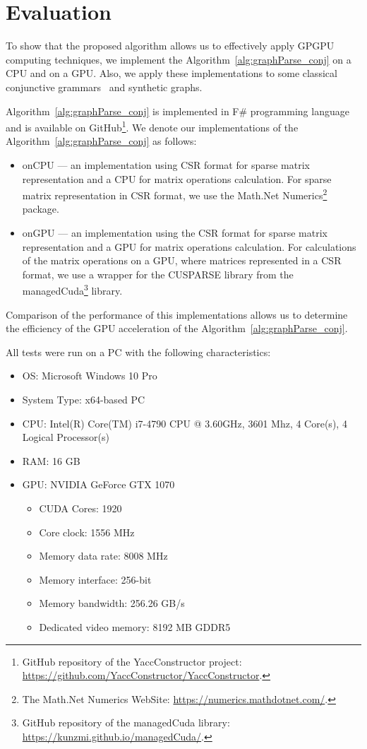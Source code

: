 \section{Evaluation} \label{section_evaluation}
To show that the proposed algorithm allows us to effectively apply GPGPU computing techniques, we implement the Algorithm~\ref{alg:graphParse_conj} on a CPU and on a GPU. Also, we apply these implementations to some classical conjunctive grammars~\cite{okhotin2001conjunctive} and synthetic graphs.

Algorithm~\ref{alg:graphParse_conj} is implemented in F\# programming language~\cite{fsharp} and is available on GitHub\footnote{GitHub repository of the YaccConstructor project: \url{https://github.com/YaccConstructor/YaccConstructor}.}. We denote our implementations of the Algorithm~\ref{alg:graphParse_conj} as follows:
\begin{itemize}
	\item onCPU --- an implementation using CSR format for sparse matrix representation and a CPU for matrix operations calculation. For sparse matrix representation in CSR format, we use the Math.Net Numerics\footnote{The Math.Net Numerics WebSite: \url{https://numerics.mathdotnet.com/}.} package.
	\item onGPU --- an implementation using the CSR format for sparse matrix representation and a GPU for matrix operations calculation. For calculations of the matrix operations on a GPU, where matrices represented in a CSR format, we use a wrapper for the CUSPARSE library from the managedCuda\footnote{GitHub repository of the managedCuda library: \url{https://kunzmi.github.io/managedCuda/}.} library.
\end{itemize}

Comparison of the performance of this implementations allows us to determine the efficiency of the GPU acceleration of the Algorithm~\ref{alg:graphParse_conj}.

All tests were run on a PC with the following characteristics:
\begin{itemize}
	\item OS: Microsoft Windows 10 Pro
	\item System Type: x64-based PC
	\item CPU: Intel(R) Core(TM) i7-4790 CPU @ 3.60GHz, 3601 Mhz, 4 Core(s), 4 Logical Processor(s)
	\item RAM: 16 GB
	\item GPU: NVIDIA GeForce GTX 1070
	\begin{itemize}
		\item CUDA Cores:		1920 
		\item Core clock:		1556 MHz 
		\item Memory data rate:	8008 MHz
		\item Memory interface:	256-bit 
		\item Memory bandwidth:	256.26 GB/s
		\item Dedicated video memory:	8192 MB GDDR5
	\end{itemize}
\end{itemize}

